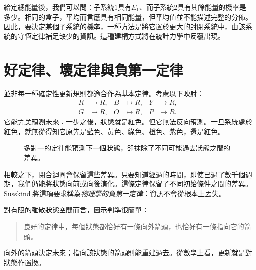 給定總能量後，我們可以問：子系統\(1\)具有\(E_1\)、而子系統\(2\)具有其餘能量的機率是多少。相同的盒子，平均而言應具有相同能量，但平均值並不能描述完整的分佈。因此，要決定某個子系統的機率，一種方法是將它置於更大的封閉系統中，由該系統的守恆定律補足缺少的資訊。這種建構方式將在統計力學中反覆出現。

\section{好定律、壞定律與負第一定律}

並非每一種確定性更新規則都適合作為基本定律。考慮以下映射：
\begin{equation}
 \begin{aligned}
 R&\mapsto R,& B&\mapsto R,& Y&\mapsto R,\\
 G&\mapsto R,& O&\mapsto R,& P&\mapsto R.
 \end{aligned}
 \label{eq:sm1-all-to-red}
\end{equation}
它能完美預測未來：一步之後，狀態就是紅色。但它無法反向預測。一旦系統處於紅色，就無從得知它原先是藍色、黃色、綠色、橙色、紫色，還是紅色。

\begin{figure}[htbp]
\centering
{}
\caption{多對一的定律能預測下一個狀態，卻抹除了不同可能過去狀態之間的差異。}
\label{fig:sm1-bad-law}
\end{figure}

相較之下，閉合迴圈會保留這些差異。只要知道經過的時間，即使已過了數千個週期，我們仍能將狀態向前或向後演化。這條定律保留了不同初始條件之間的差異。Susskind 將這項要求稱為\emph{物理學的負第一定律}：資訊不會從根本上丟失。

對有限的離散狀態空間而言，圖示判準很簡單：
\begin{quote}
良好的定律中，每個狀態都恰好有一條向外箭頭，也恰好有一條指向它的箭頭。
\end{quote}
向外的箭頭決定未來；指向該狀態的箭頭則能重建過去。從數學上看，更新就是對狀態作置換。

